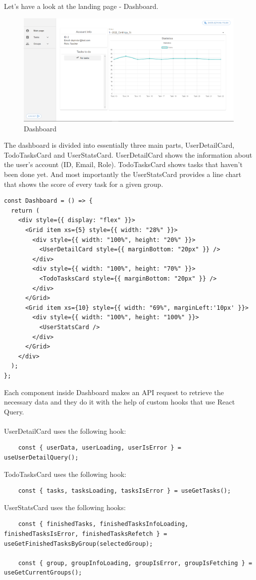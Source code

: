 \documentclass[singlespacing,12pt,parskip,headsepline,consistentlayout]{article}
\begin{document}
Let's have a look at the landing page - Dashboard.
\begin{figure}[H]
    \centering
    \includegraphics[width=\textwidth,height=\textheight,keepaspectratio]{img/dashboardPage.png}
    \caption{Dashboard}
\end{figure}
\pagebreak

The dashboard is divided into essentially three main parts, UserDetailCard, TodoTasksCard and UserStatsCard. UserDetailCard shows the information about the user's account (ID, Email, Role). TodoTasksCard shows tasks that haven't been done yet. And most importantly the UserStatsCard provides a line chart that shows the score of every task for a given group.

\vspace{0.5cm}
\begin{lstlisting}
const Dashboard = () => {
  return (
    <div style={{ display: "flex" }}>
      <Grid item xs={5} style={{ width: "28%" }}>
        <div style={{ width: "100%", height: "20%" }}>
          <UserDetailCard style={{ marginBottom: "20px" }} />
        </div>
        <div style={{ width: "100%", height: "70%" }}>
          <TodoTasksCard style={{ marginBottom: "20px" }} />
        </div>
      </Grid>
      <Grid item xs={10} style={{ width: "69%", marginLeft:'10px' }}>
        <div style={{ width: "100%", height: "100%" }}>
          <UserStatsCard />
        </div>
      </Grid>
    </div>
  );
};
\end{lstlisting}

Each component inside Dashboard makes an API request to retrieve the necessary data and they do it with the help of custom hooks that use React Query.\\
\\
UserDetailCard uses the following hook:
\begin{lstlisting}
    const { userData, userLoading, userIsError } = useUserDetailQuery();
\end{lstlisting}
TodoTasksCard uses the following hook:
\begin{lstlisting}
    const { tasks, tasksLoading, tasksIsError } = useGetTasks();
\end{lstlisting}
\pagebreak
UserStatsCard uses the following hooks:
\begin{lstlisting}
    const { finishedTasks, finishedTasksInfoLoading, finishedTasksIsError, finishedTasksRefetch } = useGetFinishedTasksByGroup(selectedGroup);

    const { group, groupInfoLoading, groupIsError, groupIsFetching } = useGetCurrentGroups();
\end{lstlisting}
\end{document}

